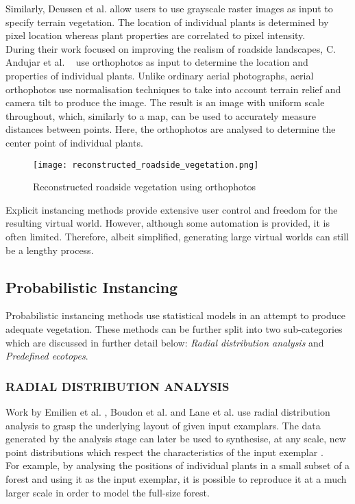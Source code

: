 Similarly, Deussen et al. \cite{Deussen1998} allow users to use grayscale raster images as input to specify terrain vegetation. The location of individual plants is determined by pixel location whereas plant properties are correlated to pixel intensity.\\

During their work focused on improving the realism of roadside landscapes, C. Andujar et al. ~\cite{Andujar2014} use orthophotos as input to determine the location and properties of individual plants. Unlike ordinary aerial photographs, aerial orthophotos use normalisation techniques to take into account terrain relief and camera tilt to produce the image. The result is an image with uniform scale throughout, which, similarly to a map, can be used to accurately measure distances between points. Here, the orthophotos are analysed to determine the center point of individual plants.\\

\begin{figure}[!htb]
  \centering
	\label{Reconstructed roadside vegetation using orthophotos}
	\texttt{[image: reconstructed\_roadside\_vegetation.png]}
	\caption{Reconstructed roadside vegetation using orthophotos ~\cite{Andujar2014}}
\end{figure}

Explicit instancing methods provide extensive user control and freedom for the resulting virtual world. However, although some automation is provided, it is often limited. Therefore, albeit simplified, generating large virtual worlds can still be a lengthy process. \\

\subsection{Probabilistic Instancing} \label{Probabilistic Instancing}

Probabilistic instancing methods use statistical models in an attempt to produce adequate vegetation. These methods can be further split into two sub-categories which are discussed in further detail below: \textit{Radial distribution analysis} and \textit{Predefined ecotopes}.\\

\subsubsection{RADIAL DISTRIBUTION ANALYSIS}
Work by Emilien et al. \cite{Emilien}, Boudon et al. \cite{Boudon2007} and Lane et al. \cite{Lane2002} use radial distribution analysis to grasp the underlying layout of given input examplars. The data generated by the analysis stage can later be used to synthesise, at any scale, new point distributions which respect the characteristics of the input exemplar \cite{Oztireli2012}. \\
For example, by analysing the positions of individual plants in a small subset of a forest and using it as the input exemplar, it is possible to reproduce it at a much larger scale in order to model the full-size forest.\\

